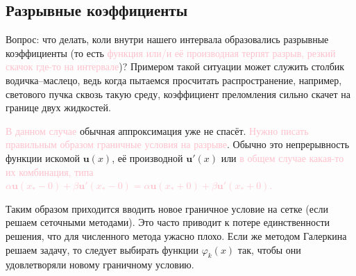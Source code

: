 \documentclass[a4,14pt,russian]{article}
\begin{document}
\subsection{Разрывные коэффициенты}
    Вопрос: что делать, коли внутри нашего интервала образовались разрывные коэффициенты (то есть \textcolor{pink}{функция или/и её производная терпят разрыв, резкий скачок где-то на интервале})? Примером такой ситуации может служить столбик водичка--маслецо, ведь когда пытаемся просчитать распространение, например, светового пучка сквозь такую среду, коэффициент преломления сильно скачет на границе двух жидкостей.\par
    \textcolor{pink}{В данном случае} обычная аппроксимация уже не спасёт. \textcolor{pink}{Нужно писать правильным образом граничные условия на разрыве}. Обычно это непрерывность функции искомой $\boldsymbol u(x)$, её производной $\boldsymbol u'(x)$ или \textcolor{pink}{в общем случае какая-то их комбинация, типа $\alpha \boldsymbol u(x_* - 0) + \beta \boldsymbol u'(x_* - 0) =\alpha \boldsymbol u(x_* + 0) + \beta \boldsymbol u'(x_* + 0)$.}\par
    Таким образом приходится вводить новое граничное условие на сетке (если решаем сеточными методами). Это часто приводит к потере единственности решения, что для численного метода ужасно плохо. Если же методом Галеркина решаем задачу, то следует выбирать функции $\varphi_k(x)$ так, чтобы они удовлетворяли новому граничному условию.
\end{document}
